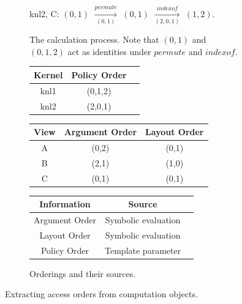 \documentclass[sigconf,review=true]{acmart}
\begin{document}
\begin{figure}
\begin{subfigure}{0.45\textwidth}
\begin{center}
		knl2, C: $(0,1)$ $\xrightarrow[(0,1)]{permute}$ $(0,1)$ $\xrightarrow[(2,0,1)]{indexof}$ $(1,2)$.
	\end{center}
	\caption{The calculation process. Note that $(0,1)$ and $(0,1,2)$ act as identities under $permute$ and $indexof$.}
	\label{accessOrder:calc}
	\end{subfigure}

	\vspace{10px}
	\begin{subfigure}{0.9\textwidth}
		\begin{center}
			\begin{tabular} {|c|c|c|}
				\hline
				Kernel & Policy Order \\ \hline 
				knl1 & (0,1,2) \\
				knl2 & (2,0,1) \\
				\hline
			\end{tabular}
			\hspace{0.01\textwidth}
			\begin{tabular} {|c|c|c|}
				\hline 
				View & Argument Order & Layout Order \\  \hline 
				A & (0,2) & (0,1) \\ 
				B & (2,1) & (1,0) \\
				C & (0,1) & (0,1) \\
				\hline
			\end{tabular}
			\hspace{0.01\textwidth}
			\begin{tabular} {|c|c|c|}
				\hline
				Information & Source \\ \hline 
				Argument Order & Symbolic evaluation  \\
				Layout Order & Symbolic evaluation \\
				Policy Order & Template parameter \\
				\hline
			\end{tabular}
		\end{center}
		\caption{Orderings and their sources.}
		\label{accessOrder:orders}
	\end{subfigure}
	\caption{Extracting access orders from computation objects.}
	\label{accessOrder}
\end{figure}
\end{document}
